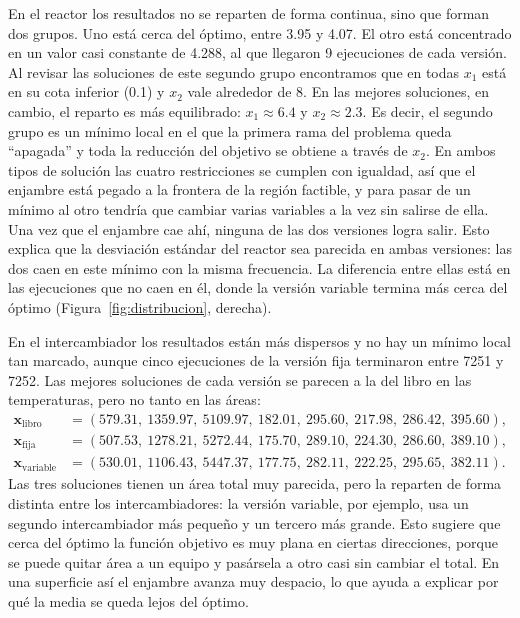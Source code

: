 En el reactor los resultados no se reparten de forma continua, sino que forman dos grupos. Uno está cerca del óptimo, entre 3.95 y 4.07. El otro está concentrado en un valor casi constante de 4.288, al que llegaron 9 ejecuciones de cada versión. Al revisar las soluciones de este segundo grupo encontramos que en todas $x_1$ está en su cota inferior (0.1) y $x_2$ vale alrededor de 8. En las mejores soluciones, en cambio, el reparto es más equilibrado: $x_1 \approx 6.4$ y $x_2 \approx 2.3$. Es decir, el segundo grupo es un mínimo local en el que la primera rama del problema queda ``apagada'' y toda la reducción del objetivo se obtiene a través de $x_2$. En ambos tipos de solución las cuatro restricciones se cumplen con igualdad, así que el enjambre está pegado a la frontera de la región factible, y para pasar de un mínimo al otro tendría que cambiar varias variables a la vez sin salirse de ella. Una vez que el enjambre cae ahí, ninguna de las dos versiones logra salir. Esto explica que la desviación estándar del reactor sea parecida en ambas versiones: las dos caen en este mínimo con la misma frecuencia. La diferencia entre ellas está en las ejecuciones que no caen en él, donde la versión variable termina más cerca del óptimo (Figura~\ref{fig:distribucion}, derecha).

En el intercambiador los resultados están más dispersos y no hay un mínimo local tan marcado, aunque cinco ejecuciones de la versión fija terminaron entre 7251 y 7252. Las mejores soluciones de cada versión se parecen a la del libro en las temperaturas, pero no tanto en las áreas:
\begin{align*}
\mathbf{x}_{\text{libro}}    &= (579.31,\ 1359.97,\ 5109.97,\ 182.01,\ 295.60,\ 217.98,\ 286.42,\ 395.60), \\
\mathbf{x}_{\text{fija}}     &= (507.53,\ 1278.21,\ 5272.44,\ 175.70,\ 289.10,\ 224.30,\ 286.60,\ 389.10), \\
\mathbf{x}_{\text{variable}} &= (530.01,\ 1106.43,\ 5447.37,\ 177.75,\ 282.11,\ 222.25,\ 295.65,\ 382.11).
\end{align*}
Las tres soluciones tienen un área total muy parecida, pero la reparten de forma distinta entre los intercambiadores: la versión variable, por ejemplo, usa un segundo intercambiador más pequeño y un tercero más grande. Esto sugiere que cerca del óptimo la función objetivo es muy plana en ciertas direcciones, porque se puede quitar área a un equipo y pasársela a otro casi sin cambiar el total. En una superficie así el enjambre avanza muy despacio, lo que ayuda a explicar por qué la media se queda lejos del óptimo.

